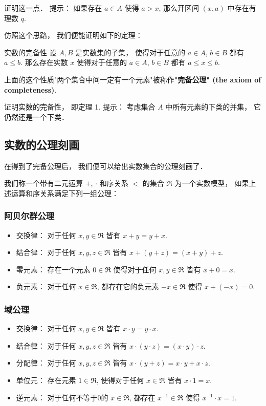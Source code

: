 \begin{exercise}{}
证明这一点． 提示： 如果存在 $a\in A$ 使得 $a>x$, 那么开区间 $(x,a)$ 中存在有理数 $q$.
\end{exercise}

仿照这个思路， 我们便能证明如下的定理：

\begin{theorem}{实数的完备性}\label{Cmplt_the1}
设 $A,B$ 是实数集的子集， 使得对于任意的 $a\in A$, $b\in B$ 都有 $a\leq b$. 那么存在实数 $x$ 使得对于任意的 $a\in A$, $b\in B$ 都有 $a\leq x\leq b$.
\end{theorem}

上面的这个性质"两个集合中间一定有一个元素"被称作\textbf{"完备公理" (the axiom of completeness)}.

\begin{exercise}{}
证明实数的完备性， 即定理 1. 提示： 考虑集合 $A$ 中所有元素的下类的并集， 它仍然还是一个下类．
\end{exercise}

\subsection{实数的公理刻画}

在得到了完备公理后， 我们便可以给出实数集合的公理刻画了． 

我们称一个带有二元运算 $+$, $\cdot$ 和序关系 $<$ 的集合 $\mathfrak{R}$ 为一个实数模型， 如果上述运算和序关系满足下列一组公理：

\subsubsection{阿贝尔群公理}
\begin{itemize}
\item 交换律： 对于任何 $x,y\in\mathfrak{R}$ 皆有 $x+y=y+x$.
\item 结合律： 对于任何 $x,y,z\in\mathfrak{R}$ 皆有 $x+(y+z)=(x+y)+z$.
\item 零元素： 存在一个元素 $0\in \mathfrak{R}$ 使得对于任何 $x,y\in\mathfrak{R}$ 皆有 $x+0=x$.
\item 负元素： 对于任何 $x\in\mathfrak{R}$, 都存在它的负元素 $-x\in\mathfrak{R}$ 使得 $x+(-x)=0$.
\end{itemize}

\subsubsection{域公理}
\begin{itemize}
\item 交换律： 对于任何 $x,y\in\mathfrak{R}$ 皆有 $x\cdot y=y\cdot x$.
\item 结合律： 对于任何 $x,y,z\in\mathfrak{R}$ 皆有 $x\cdot (y\cdot z)=(x\cdot y)\cdot z$.
\item 分配律： 对于任何 $x,y,z\in\mathfrak{R}$ 皆有 $x\cdot (y+z)=x\cdot y+x\cdot z$.
\item 单位元： 存在元素 $1\in\mathfrak{R}$, 使得对于任何 $x\in\mathfrak{R}$ 皆有 $x\cdot 1=x$.
\item 逆元素： 对于任何不等于0的 $x\in\mathfrak{R}$, 都存在 $x^{-1}\in\mathfrak{R}$ 使得 $x^{-1}\cdot x=1$.
\end{itemize}

